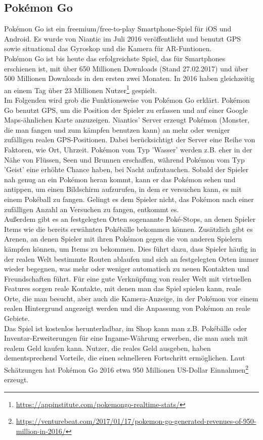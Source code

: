\documentclass[extern,palatino]{cgBA}
\begin{document}
	\subsection{Pokémon Go}
	Pokémon Go ist ein freemium/free-to-play Smartphone-Spiel für iOS und Android. Es wurde von Niantic im Juli 2016 veröffentlicht und benutzt GPS sowie situational das Gyroskop und die Kamera für AR-Funtionen.
	\\Pokémon Go ist bis heute das erfolgreichste Spiel, das für Smartphones erschienen ist, mit über 650 Millionen Downloads (Stand 27.02.2017) und über 500 Millionen Downloads in den ersten zwei  Monaten. %
	In 2016 haben gleichzeitig an einem Tag über 23 Millionen Nutzer\footnote{\url{https://appinstitute.com/pokemongo-realtime-stats/}} gespielt.%
	\\
	Im Folgenden wird grob die Funktionsweise von Pokémon Go erklärt. Pokémon Go benutzt GPS, um die Position der Spieler zu erfassen und auf einer Google Maps-ähnlichen Karte anzuzeigen.
	Niantics' Server erzeugt Pokémon (Monster, die man fangen und zum kämpfen benutzen kann) an mehr oder weniger zufälligen realen GPS-Positionen. Dabei berücksichtigt der Server eine Reihe von Faktoren, wie Ort, Uhrzeit. Pokémon vom Typ 'Wasser' werden z.B. eher in der Nähe von Flüssen, Seen und Brunnen erschaffen, während Pokémon vom Typ 'Geist' eine erhöhte Chance haben, bei Nacht aufzutauchen. Sobald der Spieler nah genug an ein Pokémon heran kommt, kann er das Pokémon sehen und antippen, um einen Bildschirm aufzurufen, in dem er versuchen kann, es mit einem Pokéball zu fangen. Gelingt es dem Spieler nicht, das Pokémon nach einer zufälligen Anzahl an Versuchen zu fangen, entkommt es.
	\\Außerdem gibt es an festgelegten Orten sogenannte Poké-Stops, an denen Spieler Items wie die bereits erwähnten Pokébälle bekommen können. Zusätzlich gibt es Arenen, an denen Spieler mit ihren Pokémon gegen die von anderen Spielern kämpfen können, um Items zu bekommen. Dies führt dazu, dass Spieler häufig in der realen Welt bestimmte Routen ablaufen und sich an festgelegten Orten immer wieder begegnen, was mehr oder weniger automatisch zu neuen Kontakten und Freundschaften führt. Für eine gute Verknüpfung von realer Welt mit virtuellen Features sorgen reale Kontakte, mit denen man das Spiel spielen kann, reale Orte, die man besucht, aber auch die Kamera-Anzeige, in der Pokémon vor einem realen Hintergrund angezeigt werden und die Anpassung von Pokémon an reale Gebiete.
	\\Das Spiel ist kostenlos herunterladbar, im Shop kann man z.B. Pokébälle oder Inventar-Erweiterungen für eine Ingame-Währung erwerben, die man auch mit realem Geld kaufen kann. Nutzer, die reales Geld ausgeben, haben dementsprechend Vorteile, die einen schnelleren Fortschritt ermöglichen. Laut Schätzungen hat Pokémon Go 2016 etwa 950 Millionen US-Dollar Einnahmen\footnote{\url{https://venturebeat.com/2017/01/17/pokemon-go-generated-revenues-of-950-million-in-2016/}} erzeugt.
\end{document}
